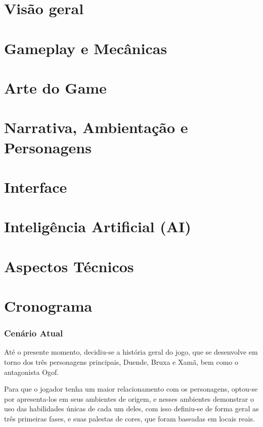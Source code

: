 \chapter{Visão geral}


\chapter{Gameplay e Mecânicas}


\chapter{Arte do Game}


\chapter{Narrativa, Ambientação e Personagens}


\chapter{Interface}


\chapter{Inteligência Artificial (AI)}


\chapter{Aspectos Técnicos}


\chapter{Cronograma}

\subsection{Cenário Atual}

Até o presente momento, decidiu-se a história geral do jogo, que se desenvolve em torno dos três personagens principais, Duende, Bruxa e Xamã, bem como o antagonista Ogof.

Para que o jogador tenha um maior relacionamento com os personagens, optou-se por apresenta-los em seus ambientes de origem, e nesses ambientes demonstrar o uso das habilidades únicas de cada um deles, com isso definiu-se de forma geral as três primeiras fases, e suas palestas de cores, que foram baseadas em locais reais. 


